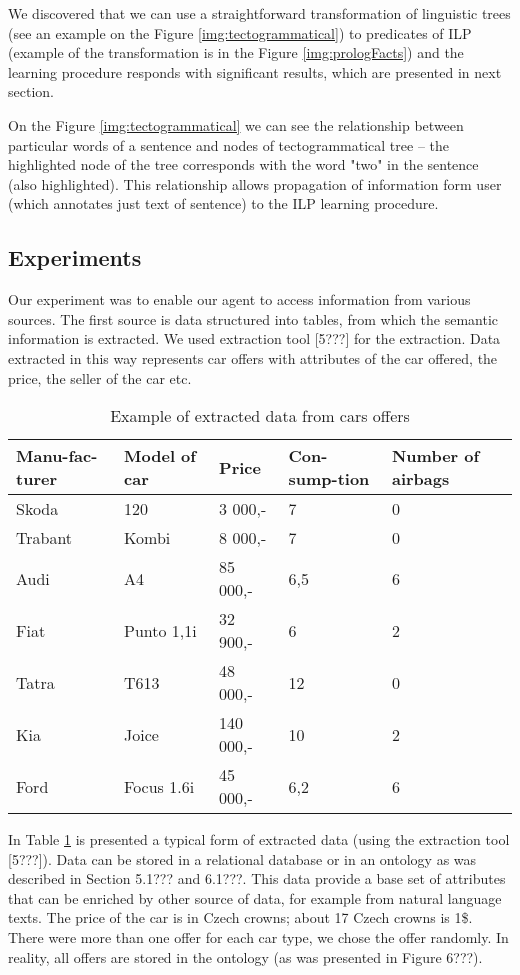 \documentclass{sig-alternate}
\begin{document}
We discovered that we can use a straightforward transformation of linguistic trees (see an example on the Figure \ref{img:tectogrammatical}) to predicates of ILP (example of the transformation is in the Figure \ref{img:prologFacts}) and the learning procedure responds with significant results, which are presented in next section.

On the Figure \ref{img:tectogrammatical} we can see the relationship between particular words of a sentence and nodes of tectogrammatical tree -- the highlighted node of the tree corresponds with the word "two" in the sentence (also highlighted). This relationship allows propagation of information form user (which annotates just text of sentence) to the ILP learning procedure.


\subsection{Experiments}
Our experiment was to enable our agent to access information from various sources. The first source is data structured into tables, from which the semantic information is extracted. We used extraction tool [5???] for the extraction. Data extracted in this way represents car offers with attributes of the car offered, the price, the seller of the car etc.

\begin{table}
\label{tab:extracted}
\centering
\caption{Example of extracted data from cars offers }
\begin{tabular}{|p{35pt}|p{35pt}|p{35pt}|p{35pt}|p{35pt}|} \hline
Manu-fac-turer&Model  of car	&Price&Con-sump-tion &Number of airbags	\\ \hline\hline
Skoda	& 120&3 000,-&7&0 \\ \hline
Trabant	& Kombi&8 000,-&7&0 \\ \hline
Audi	& A4&85 000,-&6,5&6 \\ \hline
Fiat	& Punto 1,1i&32 900,-&6&2 \\ \hline
Tatra	& T613&48 000,-&12&0 \\ \hline
Kia	& Joice&140 000,-&10&2 \\ \hline
Ford	& Focus 1.6i&45 000,-&6,2&6 \\ \hline
\end{tabular}
\end{table}


In Table \ref{tab:extracted} is presented a typical form of extracted data (using the extraction tool [5???]). Data can be stored in a relational database or in an ontology as was described in Section 5.1??? and 6.1???. This data provide a base set of attributes that can be enriched by other source of data, for example from natural language texts.
The price of the car is in Czech crowns; about 17 Czech crowns is 1\$. There were more than one offer for each car type, we chose the offer randomly. In reality, all offers are stored in the ontology (as was presented in Figure 6???).
\end{document}
